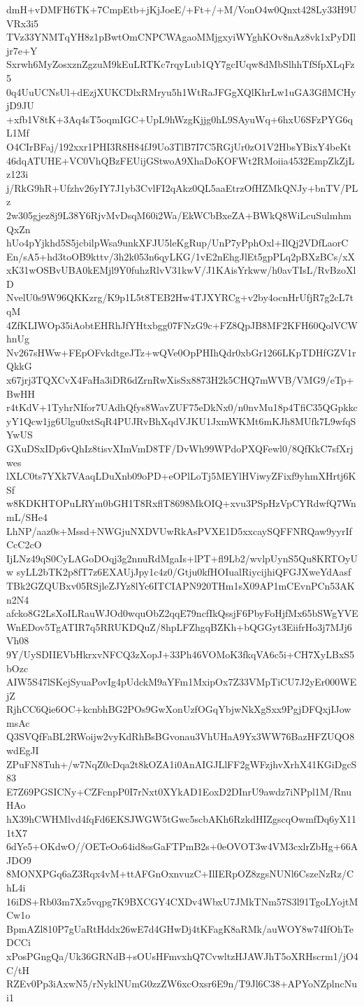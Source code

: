dmH+vDMFH6TK+7CmpEtb+jKjJoeE/+Ft+/+M/VonO4w0Qnxt428Ly33H9UVRx3i5
TVz33YNMTqYH8z1pBwtOmCNPCWAgaoMMjgxyiWYghKOv8nAz8vk1xPyDIljr7e+Y
Sxrwh6MyZosxznZgzuM9kEuLRTKc7rqyLub1QY7gcIUqw8dMbSlhhTfSfpXLqFz5
0q4UuUCNsUl+dEzjXUKCDlxRMryu5h1WtRaJFGgXQlKhrLw1uGA3GflMCHyjD9JU
+xfb1V8tK+3Aq4sT5oqmIGC+UpL9hWzgKjjg0hL9SAyuWq+6hxU6SFzPYG6qL1Mf
O4CIrBFaj/192xxr1PHI3R8H84fJ9Uo3TlB7I7C5RGjUr0zO1V2HbsYBixY4beKt
46dqATUHE+VC0VhQBzFEUijGStwoA9XhaDoKOFWt2RMoiia4532EmpZkZjLz123i
j/RkG9hR+Ufzhv26yIY7J1yb3CvlFI2qAkz0QL5aaEtrzOfHZMkQNJy+bnTV/PLz
2w305gjez8j9L38Y6RjvMvDsqM60i2Wa/EkWCbBxeZA+BWkQ8WiLcuSulmhmQxZn
hUo4pYjkhd5S5jcbilpWsa9unkXFJU5leKgRup/UnP7yPphOxl+IlQj2VDfLaorC
En/sA5+hd3toOB9kttv/3h2k053n6qyLKG/1vE2nEhgJlEt5gpPLq2pBXzBCs/xX
xK31wOSBvUBA0kEMjl9Y0fuhzRlvV31kwV/J1KAisYrkww/h0avTIsL/RvBzoXlD
NvelU0s9W96QKKzrg/K9p1L5t8TEB2Hw4TJXYRCg+v2by4ocnHrUfjR7g2cL7tqM
4ZfKLIWOp35iAobtEHRhJfYHtxbgg07FNzG9c+FZ8QpJB8MF2KFH60QolVCWhnUg
Nv267sHWw+FEpOFvkdtgeJTz+wQVe0OpPHIhQdr0xbGr1266LKpTDHfGZV1rQkkG
x67jrj3TQXCvX4FaHa3iDR6dZrnRwXisSx8873H2k5CHQ7mWVB/VMG9/eTp+BwHH
r4tKdV+1TyhrNIfor7UAdhQfys8WavZUF75eDkNx0/n0nvMu18p4TfiC35QGpkkc
yY1Qcw1jg6Ulgu0xtSqR4PUJRvBhXqdVJKU1JxmWKMt6mKJh8MUfk7L9wfqSYwUS
GXuDSxIDp6vQhIz8tisvXImVmD8TF/DvWh99WPdoPXQFewl0/8QfKkC7sfXrjwes
lXLC0ts7YXk7VAaqLDuXnb09oPD+eOPlLoTj5MEYlHViwyZFixf9yhmXHrtj6KSf
w8KDKHTOPuLRYm0bGH1T8RxflT8698MkOIQ+xvu3PSpHzVpCYRdwfQ7WnmL/SHe4
LhNP/aaz0s+Mssd+NWGjuNXDVUwRkAsPVXE1D5xxcaySQFFNRQaw9yyrIfCcC2cO
IjLNz49qS0CyLAGoDOqj3g2nnuRdMgaIs+lPT+fl9Lb2/wvlpUynS5Qu8KRTOyUw
syLL2bTK2p8fT7z6EXAUjJpy1c4z0/Gtju0kfHOIualRiycijhiQFGJXweYdAasf
TBk2GZQUBxv05RSjleZJYz8lYc6ITCIAPN920THm1sX09AP1mCEvnPCn53AKn2N4
afcko8G2LsXoILRauWJOd0wquObZ2qqE79ncfIkQssjF6PbyFoHjfMx65bSWgYVE
WnEDov5TgATIR7q5RRUKDQuZ/8hpLFZhgqBZKh+bQGGyt3EiifrHo3j7MJj6Vh08
9Y/UySDIIEVbHkrxvNFCQ3zXopJ+33Ph46VOMoK3fkqVA6c5i+CH7XyLBxS5bOzc
AIW5S47lSKejSyuaPovIg4pUdckM9aYFm1MxipOx7Z33VMpTiCU7J2yEr000WEjZ
RjhCC6Qie6OC+kcnbhBG2POs9GwXonUzfOGqYbjwNkXgSxx9PgjDFQxjIJowmsAc
Q3SVQfFaBL2RWoijw2vyKdRhBsBGvonau3VhUHaA9Yx3WW76BazHFZUQO8wdEgJI
ZPuFN8Tuh+/w7NqZ0cDqa2t8kOZA1i0AnAIGJLlFF2gWFzjhvXrhX41KGiDgcS83
E7Z69PGSICNy+CZFcnpP0I7rNxt0XYkAD1EoxD2DInrU9awdz7iNPpl1M/RnuHAo
hX39hCWHMlvd4fqFd6EKSJWGW5tGwc5scbAKh6RzkdHIZgscqOwmfDq6yX111tX7
6dYe5+OKdwO//OETeOo64id8ssGaFTPmB2s+0eOVOT3w4VM3cxlrZbHg+66AJDO9
8MONXPGq6aZ3Rqx4vM+ttAFGnOxnvuzC+IlIERpOZ8zgsNUNl6CszeNzRz/ChL4i
16iDS+Rb03m7Xz5vqpg7K9BXCGY4CXDv4WbxU7JMkTNm57S3l91TgoLYojtMCw1o
BpmAZl810P7gUaRtHddx26wE7d4GHwDj4tKFagK8aRMk/auWOY8w74IfOhTeDCCi
xPosPGngQa/Uk36GRNdB+sOUsHFmvxhQ7CvwltzHJAWJhT5oXRHscrm1/jO4C/tH
RZEv0Pp3iAxwN5/rNyklNUmG0zzZW6xcOxsr6E9n/T9Jl6C38+APYoNZplncNui1
